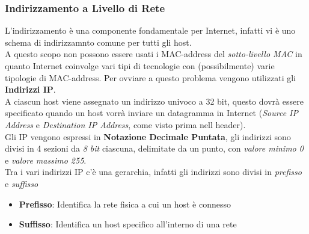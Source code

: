 \documentclass{article}
\begin{document}
            \subsubsection{Indirizzamento a Livello di Rete}
                L'indirizzamento è una componente fondamentale per Internet, infatti vi è uno schema di indirizzamnto comune per tutti gli host.\\
                A questo scopo non possono essere usati i MAC-address del \textit{sotto-livello MAC} in quanto Internet coinvolge vari tipi di tecnologie con (possibilmente) varie tipologie di MAC-address. Per ovviare a questo problema vengono utilizzati gli \textbf{Indirizzi IP}.\\
                A ciascun host viene assegnato un indirizzo univoco a 32 bit, questo dovrà essere specificato quando un host vorrà inviare un datagramma in Internet (\textit{Source IP Address} e \textit{Destination IP Address}, come visto prima nell header).\\
                Gli IP vengono espressi in \textbf{Notazione Decimale Puntata}, gli indirizzi sono divisi in 4 sezioni da \textit{8 bit} ciascuna, delimitate da un punto, con \textit{valore minimo 0} e \textit{valore massimo 255}.\\
                Tra i vari indirizzi IP c'è una gerarchia, infatti gli indirizzi sono divisi in \textit{prefisso} e \textit{suffisso}
                \begin{itemize}
                    \item \textbf{Prefisso}: Identifica la rete fisica a cui un host è connesso
                    \item \textbf{Suffisso}: Identifica un host specifico all'interno di una rete
                \end{itemize} 
\end{document}
